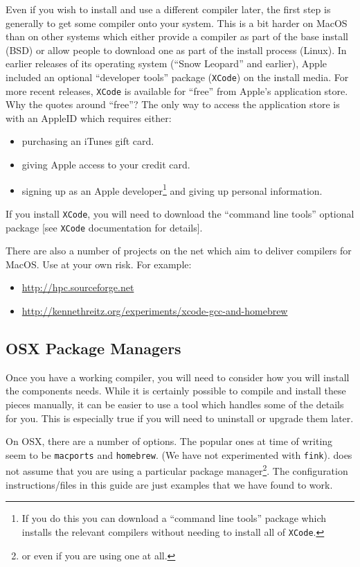 Even if you wish to install and use a different compiler later, the first step is generally 
to get some compiler onto your system.
This is a bit harder on MacOS than on other systems which either provide a compiler as part of the base install (BSD) or allow 
people to download one as part of the install process (Linux).
In earlier releases of its operating system (``Snow Leopard'' and earlier), Apple included an optional ``developer tools'' package (\texttt{XCode}) on the install media.
For more recent releases, \texttt{XCode} is available for ``free'' from Apple's application store.
Why the quotes around ``free''? 
The only way to access the application store is with an AppleID which requires either:
\begin{itemize}
 \item purchasing an iTunes gift card.
 \item giving Apple access to your credit card.
 \item signing up as an Apple developer\footnote{If you do this you can download a ``command line tools'' package
 which installs the relevant compilers without needing to install all of \texttt{XCode}.}  and giving up personal information.
\end{itemize}

If you install \texttt{XCode}, you will need to download the ``command line tools'' optional package [see \texttt{XCode} documentation for details].

There are also a number of projects on the net which aim to deliver compilers for MacOS.
Use at your own risk.
For example:
\begin{itemize}
 \item \url{http://hpc.sourceforge.net}
 \item \url{http://kennethreitz.org/experiments/xcode-gcc-and-homebrew}
\end{itemize}

\subsection{OSX Package Managers}\label{sec:osxpackagemanager}
Once you have a working compiler, you will need to consider how you will install the components \escript needs.
While it is certainly possible to compile and install these pieces manually, it can be easier to use a tool
which handles some of the details for you.
This is especially true if you will need to uninstall or upgrade them later.

On OSX, there are a number of options. 
The popular ones at time of writing seem to be \texttt{macports} and \texttt{homebrew}.
(We have not experimented with \texttt{fink}).
\escript does not assume that you are using a particular package manager\footnote{or even if you are using one at all.}.
The configuration instructions/files in this guide are just examples that we have found to work.

